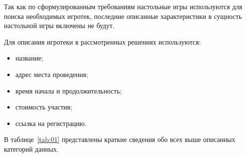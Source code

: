 Так как по сформулированным требованиям настольные игры используются для поиска
необходимых игротек, последние описанные характеристики в сущность настольной
игры включены не будут.

Для описания игротеки в рассмотренных решениях используются:
\begin{itemize}
    \item название;
    \item адрес места проведения;
    \item время начала и продолжительность;
    \item стоимость участия;
    \item ссылка на регистрацию.
\end{itemize}

В таблице~\ref{tab:01} представлены краткие сведения обо всех выше описанных
категорий данных.

